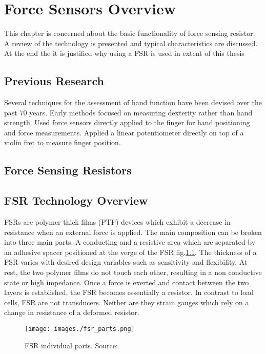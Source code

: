 \chapter{Force Sensors Overview}
\label{ch:overview}


This chapter is concerned about the basic functionality of force sensing resistor. A review of the technology is presented and typical characteristics are discussed. At the end the it is justified why using a FSR is used in extent of this thesis

\section{Previous Research}

Several techniques for the assessment of hand function have been devised over the past 70 years. Early methods focused on measuring dexterity rather than hand strength.\cite{nikonovas2004application} Used force sensors directly applied to the finger for hand positioning and force measurements. \cite{grosshauser2013finger} Applied a linear potentiometer directly on top of a violin fret to measure finger position.

\section{Force Sensing Resistors}


\section{FSR Technology Overview}
FSRs are polymer thick films (PTF) devices which exhibit a decrease in resistance when an external force is applied. The main composition can be broken into three main parts. A conducting and a resistive area which are separated by an adhesive spacer positioned at the verge of the FSR fig.\ref{fig:fsrcomposition}. The thickness of a FSR varies with desired design variables such as sensitivity and flexibility. At rest, the two polymer films do not touch each other, resulting in a non conductive state or high impedance. Once a force is exerted and contact between the two layers is established, the FSR becomes essentially a resistor.\newline
In contrast to load cells, FSR are not transducers. Neither are they strain gauges which rely on a change in resistance of a deformed resistor.\cite{giovanelli2016force}

\begin{figure}[ht]
    \centering
    \texttt{[image: images./fsr\_parts.png]}
    \caption[Individual Parts]{FSR individual parts. Source: \cite{interlinkelectronics}}
    \label{fig:fsrcomposition}
\end{figure}

